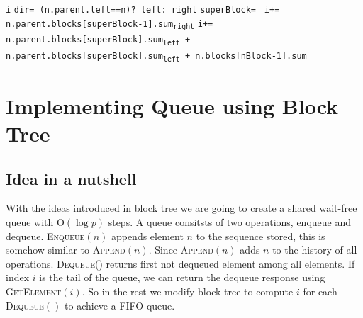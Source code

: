 \documentclass[10pt]{article}
\newcommand\keywordfont{\sffamily\bfseries}
\theoremstyle{definition}
\begin{document}
\begin{algorithm}
\begin{algorithmic}[1]
\Statex

 
\If{\texttt{n {\keywordfont is} root}} \Return \texttt{i}
\Else
\State \texttt{dir= (n.parent.left==n)? left: right}
\State \texttt{superBlock= }
\If{\texttt{dir {\keywordfont is} left}}
\State \texttt{i+= n.parent.blocks[superBlock-1].sum\textsubscript{right}}
\Else \State \texttt{i+= n.parent.blocks[superBlock].sum\textsubscript{left} + n.parent.blocks[superBlock].sum\textsubscript{left} + n.blocks[nBlock-1].sum}
\EndIf
\State \Return{}
\EndIf
{}

\Statex

%
%

\end{algorithmic}
\end{algorithm}

\section{Implementing Queue using Block Tree}
\subsection{Idea in a nutshell}
With the ideas introduced in block tree we are going to create a shared wait-free queue with \textsc{O}$(\log p)$ steps. A queue consitsts of two operations, enqueue and dequeue. \textsc{Enqueue}$(n)$ appends element $n$ to the sequence stored, this is somehow similar to \textsc{Append}$(n)$. Since \textsc{Append}$(n)$  adds $n$ to the history of all operations. \textsc{Dequeue()} returns first not dequeued element among all elements. If index $i$ is the tail of the queue, we can return the dequeue response using \textsc{GetElement}$(i)$.  So in the rest we modify block tree to compute $i$ for each \textsc{Dequeue}$()$ to achieve a FIFO queue.
\end{document}
